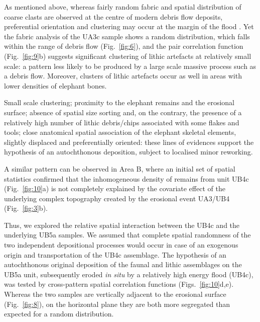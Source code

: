 \documentclass[preprint,authoryear,times]{elsarticle} %
\begin{document}
As mentioned above, whereas fairly random fabric and spatial distribution of coarse clasts are observed at the centre of modern debris flow deposits, preferential orientation and clustering may occur at the margin of the flood \citep{Pierson2005}. Yet the fabric analysis of the UA3c sample shows a random distribution, which falls within the range of debris flow (Fig.~\ref{fig:6}), and the pair correlation function (Fig.~\ref{fig:9}b) suggests significant clustering of lithic artefacts at relatively small scale: a pattern less likely to be produced by a large scale massive process such as a debris flow. Moreover, clusters of lithic artefacts occur as well in areas with lower densities of elephant bones.

Small scale clustering; proximity to the elephant remains and the erosional surface; absence of spatial size sorting and, on the contrary, the presence of a relatively high number of lithic debris/chips associated with some flakes and tools; close anatomical spatial association of the elephant skeletal elements, slightly displaced and preferentially oriented: these lines of evidences support the hypothesis of an autochthonous deposition, subject to localised minor reworking.


A similar pattern can be observed in Area B, where an initial set of spatial statistics confirmed that the inhomogeneous density of remains from unit UB4c (Fig.~\ref{fig:10}a) is not completely explained by the covariate effect of the underlying complex topography created by the erosional event UA3/UB4 (Fig.~\ref{fig:3}b).

Thus, we explored the relative spatial interaction between the UB4c and the underlying UB5a samples. We assumed that complete spatial randomness of the two independent depositional processes would occur in case of an exogenous origin and transportation of the UB4c assemblage. The hypothesis of an autochthonous original deposition of the faunal and lithic assemblages on the UB5a unit, subsequently eroded \emph{in situ} by a relatively high energy flood (UB4c), was tested by cross-pattern spatial correlation functions (Figs.~\ref{fig:10}d,e). Whereas the two samples are vertically adjacent to the erosional surface (Fig.~\ref{fig:8}), on the horizontal plane they are both more segregated than expected for a random distribution.
\end{document}
